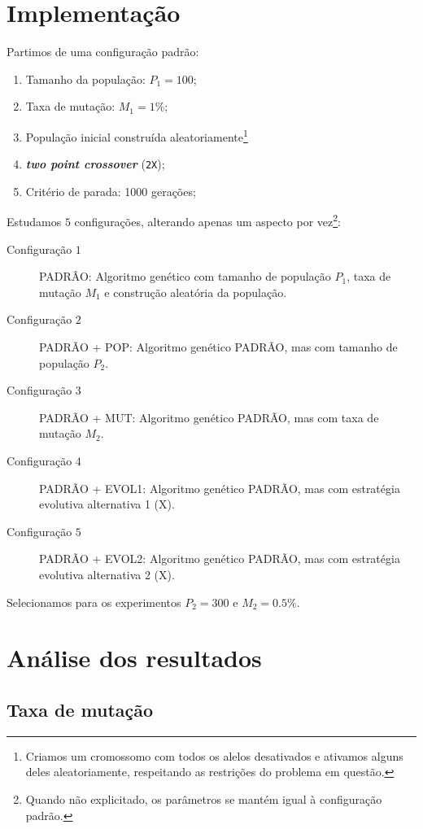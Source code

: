 \documentclass[11pt]{article}
\begin{document}
\section{Implementação}
\label{sec:implementacao}

Partimos de uma configuração padrão:

\begin{enumerate}
    \item Tamanho da população: $P_1 = 100$;
    \item Taxa de mutação: $M_1 = 1\%$;
    \item População inicial construída aleatoriamente\footnote{Criamos um cromossomo com todos os alelos desativados e ativamos alguns deles aleatoriamente, respeitando as restrições do problema em questão.}
    \item \textbf{\emph{two point crossover}} (\texttt{2X});
    \item Critério de parada: 1000 gerações;
\end{enumerate}

Estudamos \(5\) configurações, alterando apenas um aspecto por vez\footnote{Quando não explicitado, os parâmetros se mantém igual à configuração padrão.}:

\begin{description}
\item[{Configuração \(1\)}] PADRÂO: Algoritmo genético com tamanho de população $P_1$, taxa de mutação $M_1$ e construção aleatória da população.
\item[{Configuração \(2\)}] PADRÃO + POP: Algoritmo genético PADRÃO, mas com tamanho de população $P_2$.
\item[{Configuração \(3\)}] PADRÃO + MUT: Algoritmo genético PADRÃO, mas com taxa de mutação $M_2$.
\item[{Configuração \(4\)}] PADRÃO + EVOL1: Algoritmo genético PADRÃO, mas com estratégia evolutiva alternativa 1 (X).
\item[{Configuração \(5\)}] PADRÃO + EVOL2: Algoritmo genético PADRÃO, mas com estratégia evolutiva alternativa 2 (X).
\end{description}

Selecionamos para os experimentos $P_2 = 300$ e $M_2 = 0.5\%$.

\section{Análise dos resultados}
\label{sec:analysis}

\subsection{Taxa de mutação}
\end{document}
